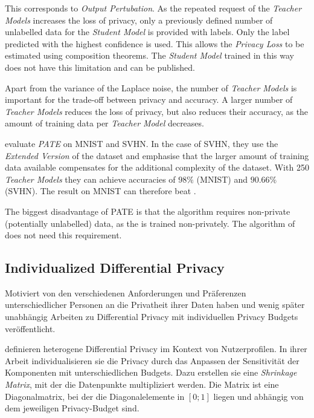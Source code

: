 This corresponds to \textit{Output Pertubation}. As the repeated request of the \textit{Teacher Models} increases the loss of privacy, only a previously defined number of unlabelled data for the \textit{Student Model} is provided with labels. Only the label predicted with the highest confidence is used. This allows the \textit{Privacy Loss} to be estimated using composition theorems. The \textit{Student Model} trained in this way does not have this limitation and can be published.

Apart from the variance of the Laplace noise, the number of \textit{Teacher Models} is important for the trade-off between privacy and accuracy. A larger number of \textit{Teacher Models} reduces the loss of privacy, but also reduces their accuracy, as the amount of training data per \textit{Teacher Model} decreases.

\textcite{papernot:2017} evaluate \textit{PATE} on MNIST and SVHN. In the case of SVHN, they use the \textit{Extended Version} of the dataset and emphasise that the larger amount of training data available compensates for the additional complexity of the dataset. With 250 \textit{Teacher Models} they can achieve accuracies of $98\%$ (MNIST) and $90.66\%$ (SVHN). The result on MNIST can therefore beat \textcite{abadi:2016}.

The biggest disadvantage of PATE is that the algorithm requires non-private (potentially unlabelled) data, as the \textcite{Student Model} is trained non-privately. The algorithm of \textcite{abadi:2016} does not need this requirement.

\subsection{Individualized Differential Privacy}\label{fund-idp}

Motiviert von den verschiedenen Anforderungen und Präferenzen unterschiedlicher Personen an die Privatheit ihrer Daten haben \textcite{alaggan:2016} und wenig später unabhängig \textcite{jorgensen:2015} Arbeiten zu Differential Privacy mit individuellen Privacy Budgets veröffentlicht.

\textcite{alaggan:2016} definieren heterogene Differential Privacy im Kontext von Nutzerprofilen. In ihrer Arbeit individualisieren sie die Privacy durch das Anpassen der Sensitivität der Komponenten mit unterschiedlichen Budgets. Dazu erstellen sie eine \textit{Shrinkage Matrix}, mit der die Datenpunkte multipliziert werden. Die Matrix ist eine Diagonalmatrix, bei der die Diagonalelemente in $[0;1]$ liegen und abhängig von dem jeweiligen Privacy-Budget sind.

